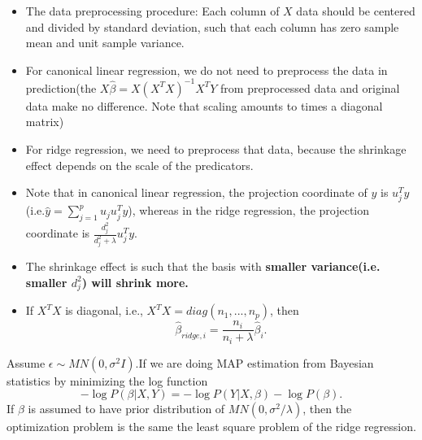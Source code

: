 \begin{refsection}
\begin{remark}\hfill
	\begin{itemize}
		\item The data preprocessing procedure:  Each column of $X$ data should be centered and divided by standard deviation, such that each column has zero sample mean and unit sample variance.
		\item For canonical linear regression, we do not need to preprocess the data in prediction(the $X\hat{\beta} = X(X^TX)^{-1} X^TY$ from preprocessed data and original data make no difference. Note that scaling amounts to times a diagonal matrix)
		\item For ridge regression, we need to preprocess that data, because the shrinkage effect depends on the scale of the predicators.  
	\end{itemize}
\end{remark}


\begin{remark}\hfill
	\begin{itemize}
		\item Note that in canonical linear regression, the projection coordinate of $y$ is $u_j^Ty$ (i.e.$ \hat{y} = \sum_{j=1}^p u_ju_j^Ty$), whereas in the ridge regression, the projection coordinate is $\frac{d_j^2}{d_j^2 + \lambda} u_j^Ty$. 
		\item The shrinkage effect is such that the basis with \textbf{smaller variance(i.e. smaller $d_j^2$) will shrink more.}
		\item If $X^TX$ is diagonal, i.e., $X^TX = diag(n_1,...,n_p)$, then 
		$$\hat{\beta}_{ridge,i} = \frac{n_i}{n_i + \lambda} \hat{\beta}_i.$$
	\end{itemize}
\end{remark}



\begin{remark}
	Assume $\epsilon \sim MN(0,\sigma^2 I)$.If we are doing MAP estimation from Bayesian statistics by minimizing the log function 
	$$-\log P(\beta|X,Y) = -\log P(Y|X,\beta) - \log P(\beta).$$
	If $\beta$ is assumed to have prior distribution of $MN(0,\sigma^2/\lambda)$, then the optimization problem is the same the least square problem of the ridge regression.
\end{remark}



\end{refsection}
